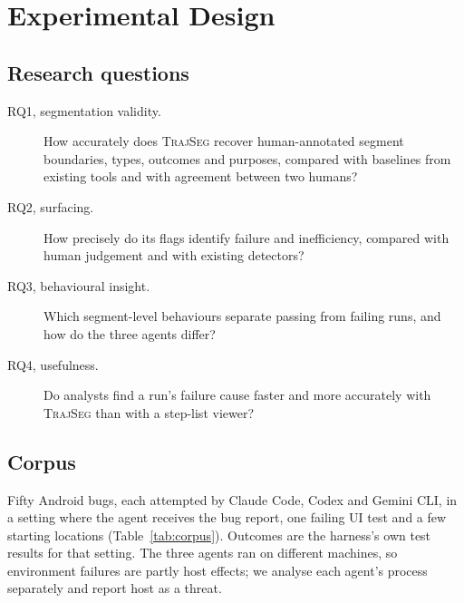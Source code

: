\documentclass[sigconf,nonacm,10pt]{acmart}
\newcommand{\tool}{\textsc{TrajSeg}}   %
\begin{document}
\section{Experimental Design}
\label{sec:design}

\subsection{Research questions}
\begin{description}
  \item[RQ1, segmentation validity.] How accurately does \tool{} recover
        human-annotated segment boundaries, types, outcomes and purposes, compared with
        baselines from existing tools and with agreement between two humans?
  \item[RQ2, surfacing.] How precisely do its flags identify failure and inefficiency,
        compared with human judgement and with existing detectors?
  \item[RQ3, behavioural insight.] Which segment-level behaviours separate passing from
        failing runs, and how do the three agents differ?
  \item[RQ4, usefulness.] Do analysts find a run's failure cause faster and more
        accurately with \tool{} than with a step-list viewer?
\end{description}

\subsection{Corpus}
Fifty Android bugs, each attempted by Claude Code, Codex and Gemini CLI, in a setting
where the agent receives the bug report, one failing UI test and a few starting
locations (Table~\ref{tab:corpus}). Outcomes are the harness's own test results for
that setting. The three agents ran on different machines, so environment failures are
partly host effects; we analyse each agent's process separately and report host as a
threat.

\begin{table}[t]
\centering
\small
\caption{Corpus. Medians per trajectory; segments and purposes from the current
prototype.}
\label{tab:corpus}
\end{table}
\end{document}
